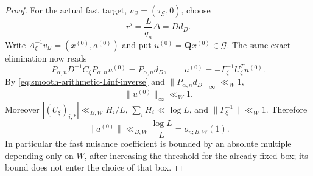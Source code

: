 \documentclass[11pt]{article}
\numberwithin{equation}{section}
\theoremstyle{definition}
\theoremstyle{remark}
\newcommand{\1}{\mathbf 1}
\begin{document}
\begin{proof}
For the actual fast target, \(v_{\mathscr Q}=(\tau_{\mathcal G},0)\),
choose
\[
 r^\flat=\frac L{q_n}\Delta=Dd_D.
\]
Write \(A_\xi^{-1}v_{\mathscr Q}=(x^{(0)},a^{(0)})\) and put
\(u^{(0)}=\mathbf Qx^{(0)}\in\mathcal G\).  The same exact elimination
now reads
\begin{equation}
 P_{\alpha,n}D^{-1}\overline C_\xi P_{\alpha,n}u^{(0)}
       =P_{\alpha,n}d_D,\qquad
 a^{(0)}=-\Gamma_\xi^{-1}U_\xi^Tu^{(0)}.
 \label{eq:smooth-fast-block-elimination}
\end{equation}
By \eqref{eq:smooth-arithmetic-Linf-inverse} and
\(\|P_{\alpha,n}d_D\|_\infty\ll_W1\),
\begin{equation}
 \|u^{(0)}\|_\infty\ll_W1.
 \label{eq:smooth-fast-quotient-bound}
\end{equation}
Moreover \(|(U_\xi)_{i,*}|\ll_{B,W}H_i/L\),
\(\sum_iH_i\ll\log L\), and \(\|\Gamma_\xi^{-1}\|\ll_W1\).  Therefore
\[
 \|a^{(0)}\|\ll_{B,W}\frac{\log L}{L}=o_{n;B,W}(1).
\]
In particular the fast nuisance coefficient is bounded by an absolute
multiple depending only on \(W\), after increasing the threshold for the
already fixed box; its bound does not enter the choice of that box.


\end{proof}
\end{document}
